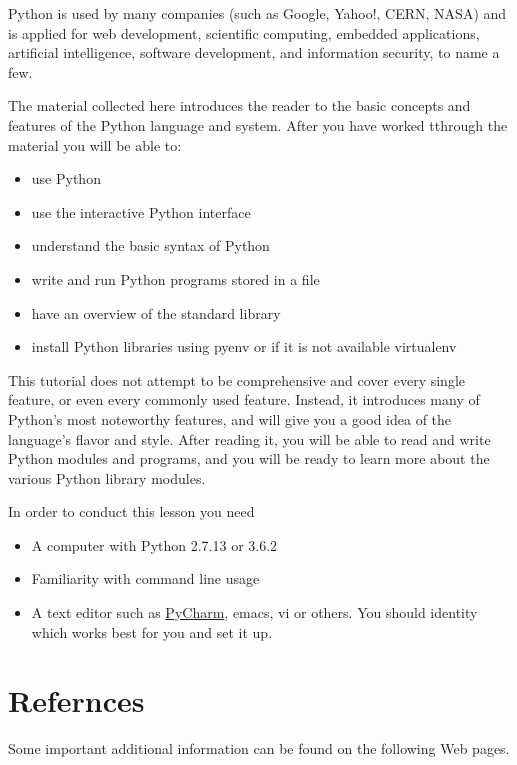 Python is used by many companies (such as Google, Yahoo!, CERN, NASA)
and is applied for web development, scientific computing, embedded
applications, artificial intelligence, software development, and
information security, to name a few.

The material collected here introduces the reader to the basic concepts and
features of the Python language and system. After you have worked
tthrough the material you will be able to:

\begin{itemize}

\item
  use Python
\item
  use the interactive Python interface
\item
  understand the basic syntax of Python
\item
  write and run Python programs stored in a file
\item
  have an overview of the standard library
\item
  install Python libraries using pyenv or if it is not available
  virtualenv
\end{itemize}

This tutorial does not attempt to be comprehensive and cover every
single feature, or even every commonly used feature. Instead, it
introduces many of Python's most noteworthy features, and will give you
a good idea of the language's flavor and style. After reading it, you
will be able to read and write Python modules and programs, and you will
be ready to learn more about the various Python library modules.

In order to conduct this lesson you need

\begin{itemize}

\item
  A computer with Python 2.7.13 or 3.6.2
\item
  Familiarity with command line usage
\item
  A text editor such as
  \href{https://www.jetbrains.com/pycharm/}{PyCharm}, emacs, vi or
  others. You should identity which works best for you and set it up.
\end{itemize}

\section{Refernces}

Some important additional information can be found on the following
Web pages.

